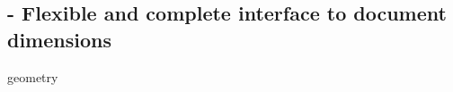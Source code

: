 
\subsection{ - Flexible and complete interface to document dimensions}

\begin{demo}{}{geometry}
	\geometry{
		hmargin = 20mm,
		paper   = a4paper,
		vmargin = 25mm,
	}
\end{demo}
